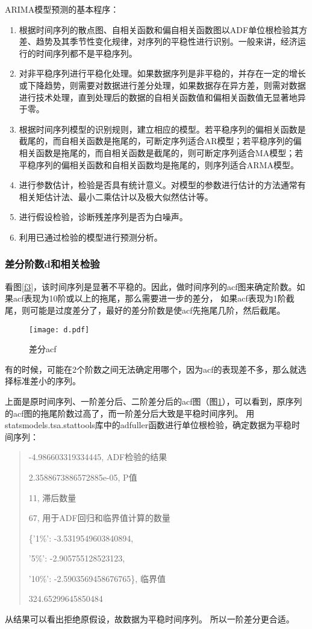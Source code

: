 \documentclass[a4paper,AutoFakeBold,AutoFakeSlant]{ctexart}
\begin{document}
ARIMA模型预测的基本程序：
\begin{enumerate}
  \item 根据时间序列的散点图、自相关函数和偏自相关函数图以ADF单位根检验其方差、趋势及其季节性变化规律，对序列的平稳性进行识别。一般来讲，经济运行的时间序列都不是平稳序列。
  \item 对非平稳序列进行平稳化处理。如果数据序列是非平稳的，并存在一定的增长或下降趋势，则需要对数据进行差分处理，如果数据存在异方差，则需对数据进行技术处理，直到处理后的数据的自相关函数值和偏相关函数值无显著地异于零。　　
  \item 根据时间序列模型的识别规则，建立相应的模型。若平稳序列的偏相关函数是截尾的，而自相关函数是拖尾的，可断定序列适合AR模型；若平稳序列的偏相关函数是拖尾的，而自相关函数是截尾的，则可断定序列适合MA模型；若平稳序列的偏相关函数和自相关函数均是拖尾的，则序列适合ARMA模型。
  \item 进行参数估计，检验是否具有统计意义。对模型的参数进行估计的方法通常有相关矩估计法、最小二乘估计以及极大似然估计等。
  \item 进行假设检验，诊断残差序列是否为白噪声。　
  \item 利用已通过检验的模型进行预测分析。
\end{enumerate}

\subsubsection{差分阶数d和相关检验}


看图\ref{f3}，该时间序列是显著不平稳的。因此，做时间序列的acf图来确定阶数。如果acf表现为10阶或以上的拖尾，那么需要进一步的差分，
如果acf表现为1阶截尾，则可能是过度差分了，最好的差分阶数是使acf先拖尾几阶，然后截尾。
\begin{figure}[H]
  \centering
  \texttt{[image: d.pdf]}
  \caption{差分acf}
  \label{f8}
\end{figure}

有的时候，可能在2个阶数之间无法确定用哪个，因为acf的表现差不多，那么就选择标准差小的序列。

上面是原时间序列、一阶差分后、二阶差分后的acf图（图\ref{f8}），可以看到，原序列的acf图的拖尾阶数过高了，而一阶差分后大致是平稳时间序列。
用statsmodels.tsa.stattools库中的adfuller函数进行单位根检验，确定数据为平稳时间序列：
\begin{quotation}
  -4.986603319334445, ADF检验的结果

  2.3588673886572885e-05, P值

  11, 滞后数量

  67, 用于ADF回归和临界值计算的数量

  \{'1\%': -3.5319549603840894,

  '5\%': -2.905755128523123,

  '10\%': -2.5903569458676765\}, 临界值

  324.65299645850484
\end{quotation}
从结果可以看出拒绝原假设，故数据为平稳时间序列。
所以一阶差分更合适。
\end{document}
